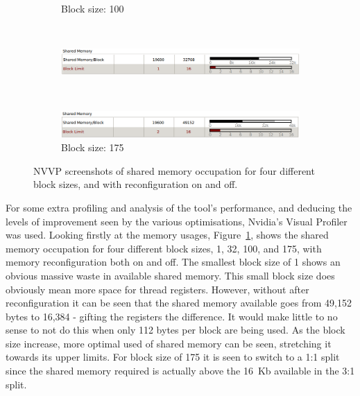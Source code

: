 \begin{figure}
\begin{subfigure}{0.6\linewidth}
		\caption{Block size: 100}
	\end{subfigure}\\
	\begin{subfigure}{0.6\linewidth}
		\centering
		\includegraphics[width=\linewidth]{Figures/sparse_shared_175}
	\end{subfigure}\\
	\begin{subfigure}{0.6\linewidth}
		\centering
		\includegraphics[width=\linewidth]{Figures/sparse_shared_M_175}
		\caption{Block size: 175}
	\end{subfigure}
	\caption{NVVP screenshots of shared memory occupation for four different block sizes, and with reconfiguration on and off.}
	\label{fig:sparse_mem_prof}
\end{figure}

For some extra profiling and analysis of the tool's performance, and deducing the levels of improvement seen by the various optimisations, Nvidia's Visual Profiler was used. Looking firstly at the memory usages, Figure~\ref{fig:sparse_mem_prof}, shows the shared memory occupation for four different block sizes, 1, 32, 100, and 175,  with memory reconfiguration both on and off. The smallest block size of 1 shows an obvious massive waste in available shared memory. This small block size does obviously mean more space for thread registers. However, without after reconfiguration it can be seen that the shared memory available goes from 49,152 bytes to 16,384 - gifting the registers the difference. It would make little to no sense to not do this when only 112 bytes per block are being used. As the block size increase, more optimal used of shared memory can be seen, stretching it towards its upper limits. For block size of 175 it is seen to switch to a 1:1 split since the shared memory required is actually above the 16~Kb available in the 3:1 split.

